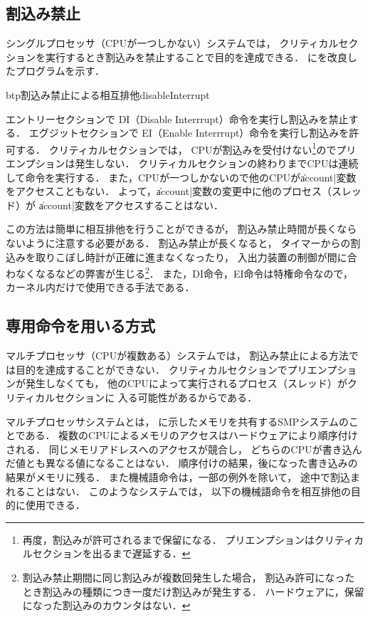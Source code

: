 \subsection{割込み禁止}
\label{disableInterrupt}
シングルプロセッサ（CPUが一つしかない）システムでは，
クリティカルセクションを実行するとき割込みを禁止することで目的を達成できる．
にを改良したプログラムを示す．

\begin{myfig}{btp}{割込み禁止による相互排他}{disableInterrupt}

\end{myfig}

エントリーセクションで
DI（Disable Interrrupt）命令を実行し割込みを禁止する．
エグジットセクションで
EI（Enable Interrrupt）命令を実行し割込みを許可する．
クリティカルセクションでは，
CPUが割込みを受付けない\footnote{
再度，割込みが許可されるまで保留になる．
プリエンプションはクリティカルセクションを出るまで遅延する．
}のでプリエンプションは発生しない．
クリティカルセクションの終わりまでCPUは連続して命令を実行する．
また，CPUが一つしかないので他のCPUが\|account|変数をアクセスこともない．
よって，\|account|変数の変更中に他のプロセス（スレッド）が
\|account|変数をアクセスすることはない．

この方法は簡単に相互排他を行うことができるが，
割込み禁止時間が長くならないように注意する必要がある．
割込み禁止が長くなると，
タイマーからの割込みを取りこぼし時計が正確に進まなくなったり，
入出力装置の制御が間に合わなくなるなどの弊害が生じる\footnote{
割込み禁止期間に同じ割込みが複数回発生した場合，
割込み許可になったとき割込みの種類につき一度だけ割込みが発生する．
ハードウェアに，保留になった割込みのカウンタはない．}．
また，DI命令，EI命令は特権命令なので，
カーネル内だけで使用できる手法である．

\subsection{専用命令を用いる方式}
マルチプロセッサ（CPUが複数ある）システムでは，
割込み禁止による方法では目的を達成することができない．
クリティカルセクションでプリエンプションが発生しなくても，
他のCPUによって実行されるプロセス（スレッド）がクリティカルセクションに
入る可能性があるからである．

マルチプロセッサシステムとは，
に示したメモリを共有するSMPシステムのことである．
複数のCPUによるメモリのアクセスはハードウェアにより順序付けされる．
同じメモリアドレスへのアクセスが競合し，
どちらのCPUが書き込んだ値とも異なる値になることはない．
順序付けの結果，後になった書き込みの結果がメモリに残る．
また機械語命令は，一部の例外を除いて，
途中で割込まれることはない．
このようなシステムでは，
以下の機械語命令を相互排他の目的に使用できる．


